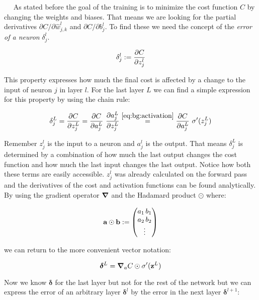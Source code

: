 $\quad$ As stated before the goal of the training is to minimize the cost function $C$ by changing the weights and biases. That means we are looking for the partial derivatives $\partial C / \partial \hat w^l_{j,k}$ and
$\partial C / \partial b^l_j$. To find these we need the concept of the \textit{error of a neuron} $\delta^l_j$.

\begin{equation}
    \delta^l_j := \pdv{C}{z^l_j}
\end{equation}

This property expresses how much the final cost is affected by a change to the input of neuron $j$ in layer $l$. For the last layer $L$ we can find a simple expression for this property by using the chain rule:

\begin{equation}
    \delta^L_j = \pdv{C}{z^L_j} = \pdv{C}{a^L_j} \ \pdv{a^L_j}{z^L_j}
    \stackrel{\eqref{eq:bg:activation}}{=}
    \pdv{C}{a^L_j} \ \sigma'(z^L_j)
\end{equation}

Remember $z^l_j$ is the input to a neuron and $a^l_j$ is the output. That means $\delta^L_j$ is determined by a combination of how much the last output changes the cost function and how much the last input changes the last output. Notice how both these terms are easily accessible. $z^l_j$ was already calculated on the forward pass and the derivatives of the cost and activation functions can be found analytically. By using the gradient operator $\grad$ and the Hadamard product $\odot$ where:

\begin{equation}
    \vb a \odot \vb b :=
    \begin{pmatrix}
        a_1 \, b_1 \\
        a_2 \, b_2 \\
        \vdots
    \end{pmatrix}
\end{equation}

we can return to the more convenient vector notation:

\begin{equation} \label{eq:bg:back1}
    \boldsymbol \delta^L = \grad_a C  \odot \sigma'(\vb z^L)
\end{equation}

Now we know $\boldsymbol \delta$ for the last layer but not for the rest of the network but we can express the error of an arbitrary layer $\boldsymbol \delta^l$ by the error in the next layer $\boldsymbol \delta^{l+1}$:

